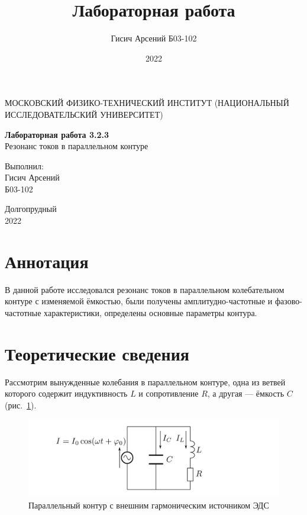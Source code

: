 \documentclass[a4paper, 12pt]{article}
\title{Лабораторная работа}
\author{Гисич Арсений Б03-102}
\date{2022}
\begin{document}
	\begin{center}
		{\large МОСКОВСКИЙ ФИЗИКО-ТЕХНИЧЕСКИЙ ИНСТИТУТ (НАЦИОНАЛЬНЫЙ ИССЛЕДОВАТЕЛЬСКИЙ УНИВЕРСИТЕТ)}
	\end{center}
	\vspace{5 cm}
	{\Large
		\begin{center}
			{\bf Лабораторная работа 3.2.3}\\[0.2 cm]
			Резонанс токов в параллельном контуре
		\end{center}
	}
	\vspace{4 cm}
	\begin{flushright}
		{\Large Выполнил: \\
			\vspace{0.2 cm}
			Гисич Арсений \\
			\vspace{0.2 cm}
			Б03-102 \\}
	\end{flushright}
	\vspace{9 cm}
	\begin{center}
		Долгопрудный\\[0.1 cm]
		2022
	\end{center}
\thispagestyle{empty}

\section{Аннотация}

В данной работе исследовался резонанс токов в параллельном колебательном контуре с изменяемой ёмкостью, были получены амплитудно-частотные и фазово-частотные характеристики, определены основные параметры контура.

\section{Теоретические сведения}

Рассмотрим вынужденные колебания в параллельном контуре, одна из ветвей которого содержит индуктивность $L$ и сопротивление $R$, а другая --- ёмкость $C$ (рис.~\ref{ris1}).

\begin{figure}[h!]
\begin{center}
    \includegraphics[scale=2]{1.png}
\end{center}
\caption{Параллельный контур с внешним гармоническим источником ЭДС}
\label{ris1}
\end{figure}
\end{document}
